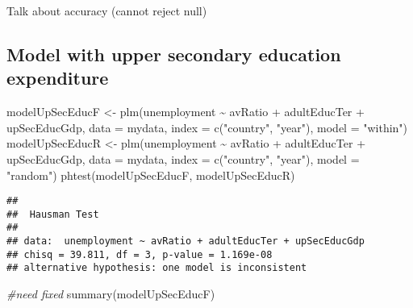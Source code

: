 \documentclass[
]{article}
\newenvironment{Shaded}{\begin{snugshade}}{\end{snugshade}}
\newcommand{\AttributeTok}[1]{\textcolor[rgb]{0.77,0.63,0.00}{#1}}
\newcommand{\CommentTok}[1]{\textcolor[rgb]{0.56,0.35,0.01}{\textit{#1}}}
\newcommand{\FunctionTok}[1]{\textcolor[rgb]{0.00,0.00,0.00}{#1}}
\newcommand{\NormalTok}[1]{#1}
\newcommand{\OtherTok}[1]{\textcolor[rgb]{0.56,0.35,0.01}{#1}}
\newcommand{\SpecialCharTok}[1]{\textcolor[rgb]{0.00,0.00,0.00}{#1}}
\newcommand{\StringTok}[1]{\textcolor[rgb]{0.31,0.60,0.02}{#1}}
\begin{document}
Talk about accuracy (cannot reject null)

\hypertarget{model-with-upper-secondary-education-expenditure}{%
\subsection{Model with upper secondary education
expenditure}\label{model-with-upper-secondary-education-expenditure}}

\begin{Shaded}
\begin{Highlighting}[]
\NormalTok{modelUpSecEducF }\OtherTok{\textless{}{-}} \FunctionTok{plm}\NormalTok{(unemployment }\SpecialCharTok{\textasciitilde{}}\NormalTok{  avRatio }\SpecialCharTok{+}\NormalTok{ adultEducTer }\SpecialCharTok{+}\NormalTok{ upSecEducGdp,}
             \AttributeTok{data =}\NormalTok{ mydata, }\AttributeTok{index =} \FunctionTok{c}\NormalTok{(}\StringTok{"country"}\NormalTok{, }\StringTok{"year"}\NormalTok{), }\AttributeTok{model =} \StringTok{"within"}\NormalTok{)}
\NormalTok{modelUpSecEducR }\OtherTok{\textless{}{-}} \FunctionTok{plm}\NormalTok{(unemployment }\SpecialCharTok{\textasciitilde{}}\NormalTok{  avRatio }\SpecialCharTok{+}\NormalTok{ adultEducTer }\SpecialCharTok{+}\NormalTok{ upSecEducGdp,}
             \AttributeTok{data =}\NormalTok{ mydata, }\AttributeTok{index =} \FunctionTok{c}\NormalTok{(}\StringTok{"country"}\NormalTok{, }\StringTok{"year"}\NormalTok{), }\AttributeTok{model =} \StringTok{"random"}\NormalTok{)}
\FunctionTok{phtest}\NormalTok{(modelUpSecEducF, modelUpSecEducR)}
\end{Highlighting}
\end{Shaded}

\begin{verbatim}
## 
##  Hausman Test
## 
## data:  unemployment ~ avRatio + adultEducTer + upSecEducGdp
## chisq = 39.811, df = 3, p-value = 1.169e-08
## alternative hypothesis: one model is inconsistent
\end{verbatim}

\begin{Shaded}
\begin{Highlighting}[]
\CommentTok{\#need fixed}
\FunctionTok{summary}\NormalTok{(modelUpSecEducF)}
\end{Highlighting}
\end{Shaded}
\end{document}
